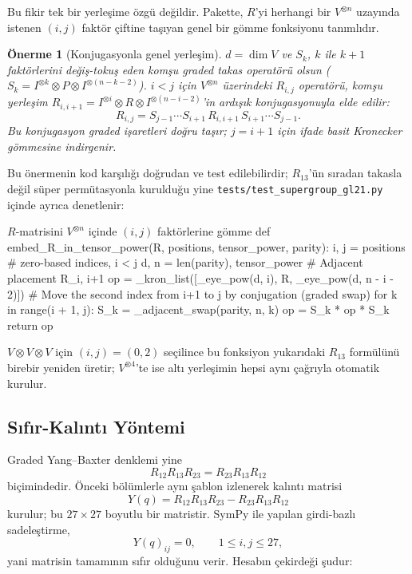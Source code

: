 \documentclass[10pt]{math}
\numberwithin{equation}{section}
\theoremstyle{plain}
\newtheorem{proposition}[theorem]{Önerme}
\theoremstyle{definition}
\begin{document}
Bu fikir tek bir yerleşime özgü değildir. Pakette, $R$'yi herhangi bir
$V^{\otimes n}$ uzayında istenen $(i,j)$ faktör çiftine taşıyan genel bir gömme
fonksiyonu tanımlıdır.

\begin{proposition}[Konjugasyonla genel yerleşim]\label{prop:embed}
$d=\dim V$ ve $S_k$, $k$ ile $k{+}1$ faktörlerini değiş-tokuş eden komşu graded
takas operatörü olsun ($S_k=I^{\otimes k}\otimes P\otimes I^{\otimes(n-k-2)}$).
$i<j$ için $V^{\otimes n}$ üzerindeki $R_{i,j}$ operatörü, komşu yerleşim
$R_{i,i+1}=I^{\otimes i}\otimes R\otimes I^{\otimes(n-i-2)}$'in ardışık
konjugasyonuyla elde edilir:
\[
R_{i,j}=S_{j-1}\cdots S_{i+1}\,R_{i,i+1}\,S_{i+1}\cdots S_{j-1}.
\]
Bu konjugasyon graded işaretleri doğru taşır; $j=i+1$ için ifade basit Kronecker
gömmesine indirgenir.
\end{proposition}

Bu önermenin kod karşılığı doğrudan ve test edilebilirdir; $R_{13}$'ün sıradan
takasla değil süper permütasyonla kurulduğu yine
\texttt{tests/test\_supergroup\_gl21.py} içinde ayrıca denetlenir:

\begin{pythoncode}{$R$-matrisini $V^{\otimes n}$ içinde $(i,j)$ faktörlerine gömme}
def embed_R_in_tensor_power(R, positions, tensor_power, parity):
    i, j = positions                       # zero-based indices, i < j
    d, n = len(parity), tensor_power
    # Adjacent placement R_{i, i+1}
    op = _kron_list([_eye_pow(d, i), R, _eye_pow(d, n - i - 2)])
    # Move the second index from i+1 to j by conjugation (graded swap)
    for k in range(i + 1, j):
        S_k = _adjacent_swap(parity, n, k)
        op = S_k * op * S_k
    return op
\end{pythoncode}

$V\otimes V\otimes V$ için $(i,j)=(0,2)$ seçilince bu fonksiyon yukarıdaki
$R_{13}$ formülünü birebir yeniden üretir; $V^{\otimes 4}$'te ise altı
yerleşimin hepsi aynı çağrıyla otomatik kurulur.

\subsection{Sıfır-Kalıntı Yöntemi}

Graded Yang--Baxter denklemi yine
\[
R_{12}R_{13}R_{23}=R_{23}R_{13}R_{12}
\]
biçimindedir. Önceki bölümlerle aynı şablon izlenerek kalıntı matrisi
\[
Y(q)=R_{12}R_{13}R_{23}-R_{23}R_{13}R_{12}
\]
kurulur; bu $27\times 27$ boyutlu bir matristir. SymPy ile yapılan girdi-bazlı
sadeleştirme,
\[
Y(q)_{ij}=0,\qquad 1\leq i,j\leq 27,
\]
yani matrisin tamamının sıfır olduğunu verir. Hesabın çekirdeği şudur:
\end{document}
